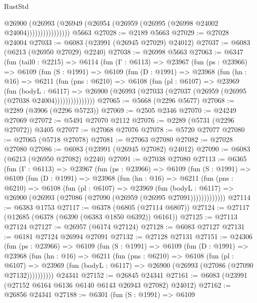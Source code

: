 \begin{lexlean}{RustStd}
\begin{coremodule}
                      @26900
                        (@26993
                          (@26949 (@26954 (@26959 (@26995 (@26998 @24002 @24004))))))))))))))))
    @5663
@27028 := @2189 @5663
@27029 := @27028 @24004
@27033 := @6083 (@23991 (@26945 @27029) @24012)
@27037 := @6083 (@6213 (@26950 @27029) @2240)
@27038 := @26998 @5663
@27063 := @6347
    (fun (tail0 : @2215) =>
    @6114
      (fun (Γ : @6113) =>
      @23967
        (fun (ps : @23966) =>
        @6109
          (fun (S : @1991) =>
          @6109
            (fun (D : @1991) =>
            @23968
              (fun (hn : @16) =>
              @6211
                (fun (pns : @6210) =>
                @6108
                  (fun (pl : @6107) =>
                  @23969
                    (fun (bodyL : @6117) =>
                    @26900 (@26993 (@27033 (@27037 (@26959 (@26995 (@27038 @24004)))))))))))))))
@27065 := @5668 (@2296 @5677)
@27068 := @2289 (@3906 (@2296 @5723))
@27069 := @2505 @2346
@27070 := @24249 @27069
@27072 := @5491 @27070 @2112
@27076 := @2289 (@5731 (@2296 @27072)) @3405
@27077 := @27068 @27076
@27078 := @5720 @27077
@27080 := @27065 (@5718 @27078)
@27081 := @27063 @27080
@27082 := @27028 @27080
@27086 := @6083 (@23991 (@26945 @27082) @24012)
@27090 := @6083 (@6213 (@26950 @27082) @2240)
@27091 := @27038 @27080
@27113 := @6365
    (fun (Γ : @6113) =>
    @23967
      (fun (ps : @23966) =>
      @6109
        (fun (S : @1991) =>
        @6109
          (fun (D : @1991) =>
          @23968
            (fun (hn : @16) =>
            @6211
              (fun (pns : @6210) =>
              @6108
                (fun (pl : @6107) =>
                @23969
                  (fun (bodyL : @6117) =>
                  @26900 (@26993 (@27086 (@27090 (@26959 (@26995 @27091)))))))))))))
@27114 := @6383 @1753
@27117 := @6378 (@6805 (@27114 @6807))
@27124 := @27117 (@12685 (@6378 (@6390 (@6383 @1850 @6392)) @6161))
@27125 := @27113 @27124
@27127 := @26957 (@6174 @27124)
@27128 := @6083 @27127
@27131 := @6181 @27124 @26994 @27091
@27132 := @27128 @27131
@27151 := @24306
    (fun (ps : @23966) =>
    @6109
      (fun (S : @1991) =>
      @6109
        (fun (D : @1991) =>
        @23968
          (fun (hn : @16) =>
          @6211
            (fun (pns : @6210) =>
            @6108
              (fun (pl : @6107) =>
              @23969 (fun (bodyL : @6117) => @26900 (@26993 (@27086 (@27090 @27132))))))))))
    @24341
@27152 := @26845 @24341
@27161 := @6083 (@23991 (@27152 @6164 @6136 @6140 @6143 @26943 @27082) @24012)
@27162 := @26856 @24341
@27188 := @6301
    (fun (S : @1991) =>
    @6109

\end{coremodule}
\end{lexlean}
